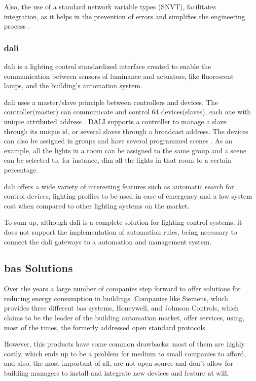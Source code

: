 Also, the use of a standard network variable types (SNVT), facilitates integration, as it helps in the prevention of errors and simplifies the engineering process \cite{Siemens2013}. 


\subsubsection{\acf{dali}}
\acf{dali} is a lighting control standardized interface created to enable the communication between sensors of luminance and actuators, like fluorescent lamps, and the building's automation system.

\ac{dali} uses a master/slave principle between controllers and devices. The controller(master) can communicate and control 64 devices(slaves), each one with unique attributed address \cite{Ma2014}. DALI supports a controller to manage a slave through its unique id, or several slaves through a broadcast address. The devices can also be assigned in groups and have several programmed scenes \cite{Ma2014}. As an example, all the lights in a room can be assigned to the same group and a scene can be selected to, for instance, dim all the lights in that room to a certain percentage. 

\ac{dali} offers a wide variety of interesting features such as automatic search for control devices, lighting profiles to be used in case of emergency and a low system cost when compared to other lighting systems on the market\cite{Zhang2006}.

To sum up, although \ac{dali} is a complete solution for lighting control systems, it does not support the implementation of automation rules, being necessary to connect the \ac{dali} gateways to a automation and management system.

\subsection{\ac{bas} Solutions}

Over the years a large number of companies step forward to offer solutions for reducing energy consumption in buildings. Companies like Siemens, which provides three different \ac{bas} systems, Honeywell, and Johnson Controls, which claims to be the leader of the building automation market, offer services, using, most of the times, the formerly addressed open standard protocols.

However, this products have some common drawbacks: most of them are highly costly, which ends up to be a problem for medium to small companies to afford, and also, the most important of all, are not open source and don't allow for building managers to install and integrate new devices and feature at will. 


